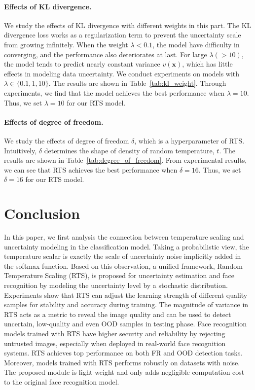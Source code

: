 \documentclass[letterpaper]{article} %
\begin{document}
\paragraph{Effects of KL divergence.} We study the effects of KL divergence with different weights in this part.
The KL divergence loss works as a regularization term to prevent the uncertainty scale from growing infinitely. When the weight $\lambda < 0.1$, the model have difficulty in converging, and the performance also deteriorates at last.
For large $\lambda (>10)$, the model tends to predict nearly constant variance $v(\bm{x})$, which has little effects in modeling data uncertainty.
We conduct experiments on models with $\lambda \in \{0.1, 1, 10\}$. The results are shown in Table~\ref{tab:kl_weight}.
Through experiments, we find that the model achieves the best performance when $\lambda = 10$. Thus, we set $\lambda = 10$ for our RTS model.

\paragraph{Effects of degree of freedom.} We study the effects of degree of freedom $\delta$, which is a hyperparameter of RTS. Intuitively, $\delta$ determines the shape of density of random temperature, $t$. The results are shown in Table~\ref{tab:degree_of_freedom}. From experimental results, we can see that RTS achieves the best performance when $\delta = 16$. Thus, we set $\delta = 16$ for our RTS model.



\section{Conclusion}
\label{sec:conclusion}

In this paper, we first analysis the connection between temperature scaling and uncertainty modeling in the classification model. Taking a probabilistic view, the temperature scalar is exactly the scale of uncertainty noise implicitly added in the softmax function. Based on this observation, a unified framework, Random Temperature Scaling (RTS), is proposed for uncertainty estimation and face recognition by modeling the uncertainty level by a stochastic distribution.  Experiments show that RTS can adjust the learning strength of different quality samples for stability and accuracy during training. The magnitude of variance in RTS acts as a metric to reveal the image quality and can be used to detect uncertain, low-quality and even OOD samples in testing phase.
Face recognition models trained with RTS have higher security and reliability by rejecting untrusted images, especially when deployed in real-world face recognition systems. RTS achieves top performance on both FR and OOD detection tasks. Moreover, models trained with RTS performs robustly on datasets with noise. The proposed module is light-weight and only adds negligible computation cost to the original face recognition model.
\end{document}
